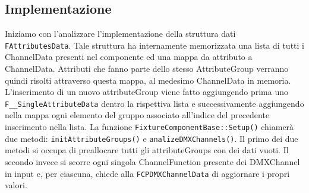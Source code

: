 \documentclass[main.tex]{subfiles}
\begin{document}
\subsection{Implementazione}\label{subsec:3_implementation}
Iniziamo con l'analizzare l'implementazione della struttura dati \lstinline{FAttributesData}. Tale struttura ha internamente memorizzata una lista di tutti i ChannelData presenti nel componente ed una mappa da attributo a ChannelData. Attributi che fanno parte dello stesso AttributeGroup verranno quindi risolti attraverso questa mappa, al medesimo ChannelData in memoria. \newline
\lstset{language=UEcpp}
%
L'inserimento di un nuovo attributeGroup viene fatto aggiungendo prima uno \lstinline{F__SingleAttributeData} dentro la rispettiva lista e successivamente aggiungendo nella mappa ogni elemento del gruppo associato all'indice del precedente inserimento nella lista.\newline
La funzione \lstinline{FixtureComponentBase::Setup()} chiamerà due metodi: \lstinline{initAttributeGroups()} e \lstinline{analizeDMXChannels()}. Il primo dei due metodi si occupa di preallocare tutti gli attributeGroups con dei dati vuoti.
%
Il secondo invece si scorre ogni singola ChannelFunction presente dei DMXChannel in input e, per ciascuna, chiede alla \lstinline{FCPDMXChannelData} di aggiornare i propri valori. \newline
\end{document}
